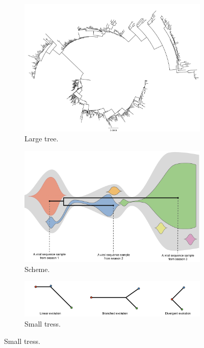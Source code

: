 \documentclass[a4paper,11pt]{article}
\begin{document}
\begin{figure}
    \begin{subfigure}{\linewidth}
    \centering
    \includegraphics[width=4in]{figures/LargeFluTree-NYH3N2-NJ.pdf}
    \caption{Large tree.}
    \end{subfigure}

    \begin{subfigure}{\linewidth}
    \centering
    \includegraphics[width=4in]{figures/influenza_schematic_part1.png}
    \caption{Scheme.}
    \end{subfigure}
   
    \begin{subfigure}{\linewidth}
    \centering
    \includegraphics[width=4in]{figures/influenza_schematic_part2.png}
    \caption{Small tress.}
    \end{subfigure}


\end{figure}
\end{document}
